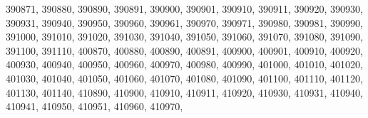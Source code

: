 \textquotesingle{}390871\textquotesingle{}, \textquotesingle{}390880\textquotesingle{}, \textquotesingle{}390890\textquotesingle{}, \textquotesingle{}390891\textquotesingle{}, \textquotesingle{}390900\textquotesingle{}, \textquotesingle{}390901\textquotesingle{}, \textquotesingle{}390910\textquotesingle{}, \textquotesingle{}390911\textquotesingle{}, \textquotesingle{}390920\textquotesingle{}, \textquotesingle{}390930\textquotesingle{}, \textquotesingle{}390931\textquotesingle{}, \textquotesingle{}390940\textquotesingle{}, \textquotesingle{}390950\textquotesingle{}, \textquotesingle{}390960\textquotesingle{}, \textquotesingle{}390961\textquotesingle{}, \textquotesingle{}390970\textquotesingle{}, \textquotesingle{}390971\textquotesingle{}, \textquotesingle{}390980\textquotesingle{}, \textquotesingle{}390981\textquotesingle{}, \textquotesingle{}390990\textquotesingle{}, \textquotesingle{}391000\textquotesingle{}, \textquotesingle{}391010\textquotesingle{}, \textquotesingle{}391020\textquotesingle{}, \textquotesingle{}391030\textquotesingle{}, \textquotesingle{}391040\textquotesingle{}, \textquotesingle{}391050\textquotesingle{}, \textquotesingle{}391060\textquotesingle{}, \textquotesingle{}391070\textquotesingle{}, \textquotesingle{}391080\textquotesingle{}, \textquotesingle{}391090\textquotesingle{}, \textquotesingle{}391100\textquotesingle{}, \textquotesingle{}391110\textquotesingle{}, \textquotesingle{}400870\textquotesingle{}, \textquotesingle{}400880\textquotesingle{}, \textquotesingle{}400890\textquotesingle{}, \textquotesingle{}400891\textquotesingle{}, \textquotesingle{}400900\textquotesingle{}, \textquotesingle{}400901\textquotesingle{}, \textquotesingle{}400910\textquotesingle{}, \textquotesingle{}400920\textquotesingle{}, \textquotesingle{}400930\textquotesingle{}, \textquotesingle{}400940\textquotesingle{}, \textquotesingle{}400950\textquotesingle{}, \textquotesingle{}400960\textquotesingle{}, \textquotesingle{}400970\textquotesingle{}, \textquotesingle{}400980\textquotesingle{}, \textquotesingle{}400990\textquotesingle{}, \textquotesingle{}401000\textquotesingle{}, \textquotesingle{}401010\textquotesingle{}, \textquotesingle{}401020\textquotesingle{}, \textquotesingle{}401030\textquotesingle{}, \textquotesingle{}401040\textquotesingle{}, \textquotesingle{}401050\textquotesingle{}, \textquotesingle{}401060\textquotesingle{}, \textquotesingle{}401070\textquotesingle{}, \textquotesingle{}401080\textquotesingle{}, \textquotesingle{}401090\textquotesingle{}, \textquotesingle{}401100\textquotesingle{}, \textquotesingle{}401110\textquotesingle{}, \textquotesingle{}401120\textquotesingle{}, \textquotesingle{}401130\textquotesingle{}, \textquotesingle{}401140\textquotesingle{}, \textquotesingle{}410890\textquotesingle{}, \textquotesingle{}410900\textquotesingle{}, \textquotesingle{}410910\textquotesingle{}, \textquotesingle{}410911\textquotesingle{}, \textquotesingle{}410920\textquotesingle{}, \textquotesingle{}410930\textquotesingle{}, \textquotesingle{}410931\textquotesingle{}, \textquotesingle{}410940\textquotesingle{}, \textquotesingle{}410941\textquotesingle{}, \textquotesingle{}410950\textquotesingle{}, \textquotesingle{}410951\textquotesingle{}, \textquotesingle{}410960\textquotesingle{}, \textquotesingle{}410970\textquotesingle{}, 